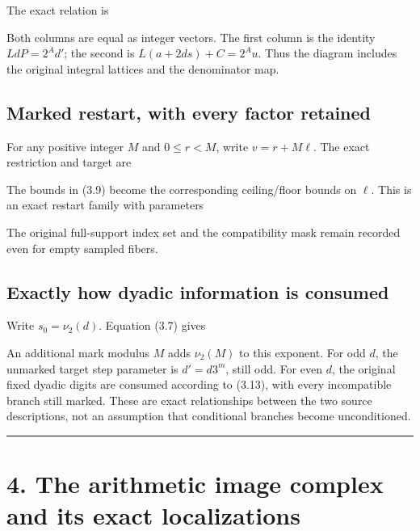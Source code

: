 The exact relation is


Both columns are equal as integer vectors. The first column is the
identity \(LdP=2^Ad'\); the second is \(L(a+2ds)+C=2^Au\). Thus the
diagram includes the original integral lattices and the denominator map.

\subsection{Marked restart, with every factor retained}

For any positive integer \(M\) and \(0\le r<M\), write \(v=r+M\ell\).
The exact restriction and target are


The bounds in (3.9) become the corresponding ceiling/floor bounds on
\(\ell\). This is an exact restart family with parameters


The original full-support index set and the compatibility mask remain
recorded even for empty sampled fibers.

\subsection{Exactly how dyadic information is consumed}

Write \(s_0=\nu_2(d)\). Equation (3.7) gives


An additional mark modulus \(M\) adds \(\nu_2(M)\) to this exponent. For
odd \(d\), the unmarked target step parameter is \(d'=d3^m\), still odd.
For even \(d\), the original fixed dyadic digits are consumed according
to (3.13), with every incompatible branch still marked. These are exact
relationships between the two source descriptions, not an assumption
that conditional branches become unconditioned.

\begin{center}\rule{0.5\linewidth}{0.5pt}\end{center}

\section{4. The arithmetic image complex and its exact localizations}

